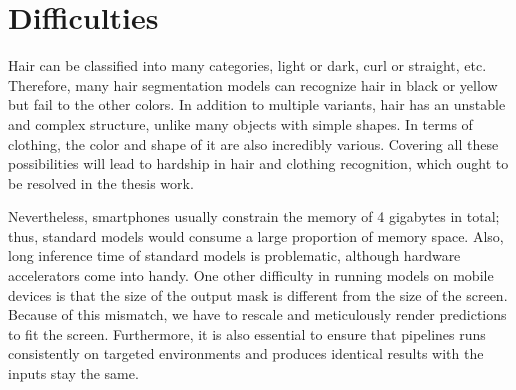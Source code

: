 \section{Difficulties} 
Hair can be classified into many categories, light or dark, curl or straight, etc. Therefore, many hair segmentation models can recognize hair in black or yellow but fail to the other colors. In addition to multiple variants, hair has an unstable and complex structure, unlike many objects with simple shapes. In terms of clothing, the color and shape of it are also incredibly various. Covering all these possibilities will lead to hardship in hair and clothing recognition, which ought to be resolved in the thesis work.


Nevertheless, smartphones usually constrain the memory of 4 gigabytes in total; thus, standard models would consume a large proportion of memory space. Also, long inference time of standard models is problematic, although hardware accelerators come into handy. One other difficulty in running models on mobile devices is that the size of the output mask is different from the size of the screen. Because of this mismatch, we have to rescale and meticulously render predictions to fit the screen. Furthermore, it is also essential to ensure that pipelines runs consistently on targeted environments and produces identical results with the inputs stay the same. 
